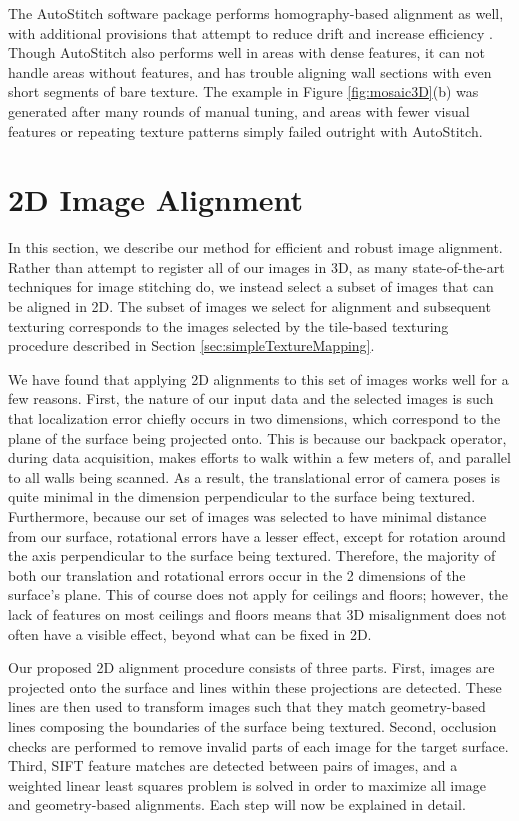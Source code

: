 \documentclass[]{spie}  %
\begin{document}
The AutoStitch software package performs homography-based alignment as
well, with additional provisions that attempt to reduce drift and
increase efficiency \cite{panorama2d, autostitch}. Though AutoStitch
also performs well in areas with dense features, it can not handle
areas without features, and has trouble aligning wall sections with
even short segments of bare texture. The example in Figure
\ref{fig:mosaic3D}(b) was generated after many rounds of manual
tuning, and areas with fewer visual features or repeating texture
patterns simply failed outright with AutoStitch.




\section{2D Image Alignment}
\label{sec:2dAlignment}
In this section, we describe our method for efficient and robust image
alignment. Rather than attempt to register all of our images in 3D, as
many state-of-the-art techniques for image stitching do, we instead
select a subset of images that can be aligned in 2D. The subset of
images we select for alignment and subsequent texturing corresponds to
the images selected by the tile-based texturing procedure described in
Section \ref{sec:simpleTextureMapping}.

We have found that applying 2D alignments to this set of images works
well for a few reasons. First, the nature of our input data and the
selected images is such that localization error chiefly occurs in two
dimensions, which correspond to the plane of the surface being
projected onto. This is because our backpack operator, during data
acquisition, makes efforts to walk within a few meters of, and
parallel to all walls being scanned. As a result, the translational
error of camera poses is quite minimal in the dimension perpendicular
to the surface being textured. Furthermore, because our set of images
was selected to have minimal distance from our surface, rotational
errors have a lesser effect, except for rotation around the axis
perpendicular to the surface being textured. Therefore, the majority
of both our translation and rotational errors occur in the 2
dimensions of the surface's plane. This of course does not apply for
ceilings and floors; however, the lack of features on most ceilings
and floors means that 3D misalignment does not often have a visible
effect, beyond what can be fixed in 2D.


Our proposed 2D alignment procedure consists of three parts. First, images
are projected onto the surface and lines within these projections are
detected. These lines are then used to transform images such that they match geometry-based lines composing the boundaries of the surface being textured. Second, occlusion checks are performed to remove invalid parts of each image for the target surface. Third, SIFT feature matches are detected between pairs of images, and a weighted linear least squares problem is solved in order to maximize all image and geometry-based alignments. Each step will now be explained in detail.
\end{document}
